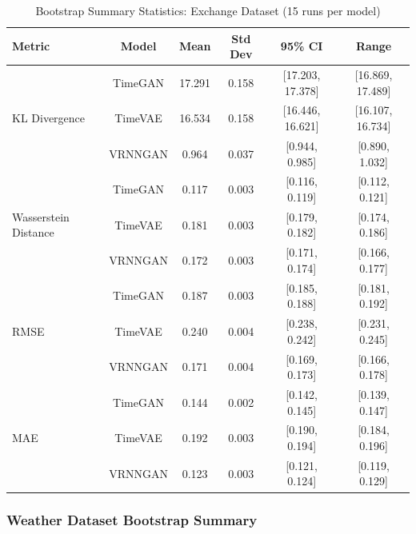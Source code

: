 \documentclass{article}
\begin{document}
\begin{table}[H]
    \centering
\caption{Bootstrap Summary Statistics: Exchange Dataset (15 runs per model)}
\label{tab:bootstrap_exchange}
\small
\begin{tabular}{lccccc}
\toprule
\textbf{Metric} & \textbf{Model} & \textbf{Mean} & \textbf{Std Dev} & \textbf{95\% CI} & \textbf{Range} \\
\midrule
\multirow{3}{*}{KL Divergence} 
    & TimeGAN   & 17.291 & 0.158 & [17.203, 17.378] & [16.869, 17.489] \\
    & TimeVAE   & 16.534 & 0.158 & [16.446, 16.621] & [16.107, 16.734] \\
    & VRNNGAN   & 0.964  & 0.037 & [0.944, 0.985]   & [0.890, 1.032] \\
\midrule
\multirow{3}{*}{Wasserstein Distance} 
    & TimeGAN   & 0.117 & 0.003 & [0.116, 0.119] & [0.112, 0.121] \\
    & TimeVAE   & 0.181 & 0.003 & [0.179, 0.182] & [0.174, 0.186] \\
    & VRNNGAN   & 0.172 & 0.003 & [0.171, 0.174] & [0.166, 0.177] \\
\midrule
\multirow{3}{*}{RMSE} 
    & TimeGAN   & 0.187 & 0.003 & [0.185, 0.188] & [0.181, 0.192] \\
    & TimeVAE   & 0.240 & 0.004 & [0.238, 0.242] & [0.231, 0.245] \\
    & VRNNGAN   & 0.171 & 0.004 & [0.169, 0.173] & [0.166, 0.178] \\
\midrule
\multirow{3}{*}{MAE} 
    & TimeGAN   & 0.144 & 0.002 & [0.142, 0.145] & [0.139, 0.147] \\
    & TimeVAE   & 0.192 & 0.003 & [0.190, 0.194] & [0.184, 0.196] \\
    & VRNNGAN   & 0.123 & 0.003 & [0.121, 0.124] & [0.119, 0.129] \\
\bottomrule
\end{tabular}
\end{table}

\subsubsection{Weather Dataset Bootstrap Summary}
\end{document}
